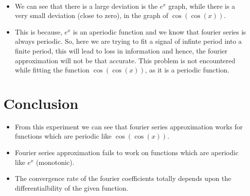 \documentclass[11pt]{article}
\providecommand{\tightlist}{%
      \setlength{\itemsep}{0pt}\setlength{\parskip}{0pt}}
\begin{document}
    \begin{center}
    \end{center}
    { \hspace*{\fill} \\}
    
    \begin{itemize}
\tightlist
\item
  We can see that there is a large deviation is the \(e^x\) graph, while
  there is a very small deviation (close to zero), in the graph of
  \(\cos(\cos(x))\).
\item
  This is because, \(e^x\) is an aperiodic function and we know that
  fourier series is always periodic. So, here we are trying to fit a
  signal of infinte period into a finite period, this will lead to loss
  in information and hence, the fourier approximation will not be that
  accurate. This problem is not encountered while fitting the function
  \(\cos(\cos(x))\), as it is a periodic function.
\end{itemize}

    \hypertarget{conclusion}{%
\section{Conclusion}\label{conclusion}}

\begin{itemize}
\tightlist
\item
  From this experiment we can see that fourier series approximation
  works for functions which are periodic like \(\cos(\cos(x))\).
\item
  Fourier series approximation fails to work on functions which are
  aperiodic like \(e^x\) (monotonic).
\item
  The convergence rate of the fourier coefficients totally depends upon
  the differentialbility of the given function.
\end{itemize}


    
    
    
    
\end{document}
